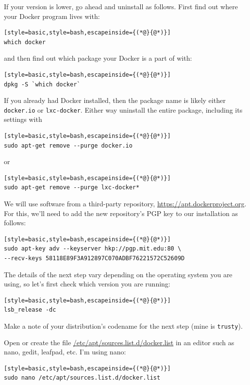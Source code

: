 \documentclass[12pt, a4paper, twoside, openany, titlepage]{book}
\begin{document}
If your version is lower, go ahead and uninstall as follows. First find out where your Docker program lives with:
\begin{lstlisting}[style=basic,style=bash,escapeinside={(*@}{@*)}]
which docker
\end{lstlisting}

and then find out which package your Docker is a part of with:
\begin{lstlisting}[style=basic,style=bash,escapeinside={(*@}{@*)}]
dpkg -S `which docker`
\end{lstlisting}

If you already had Docker installed, then the package name is likely either \texttt{docker.io} or \texttt{lxc-docker}. Either way uninstall the entire package, including its settings with
\begin{lstlisting}[style=basic,style=bash,escapeinside={(*@}{@*)}]
sudo apt-get remove --purge docker.io
\end{lstlisting}
or
\begin{lstlisting}[style=basic,style=bash,escapeinside={(*@}{@*)}]
sudo apt-get remove --purge lxc-docker*
\end{lstlisting}

We will use software from a third-party repository, \url{https://apt.dockerproject.org}. For this, we'll need to add the new repository's PGP key to our installation as follows:
\begin{lstlisting}[style=basic,style=bash,escapeinside={(*@}{@*)}]
sudo apt-key adv --keyserver hkp://pgp.mit.edu:80 \
--recv-keys 58118E89F3A912897C070ADBF76221572C52609D
\end{lstlisting}

The details of the next step vary depending on the operating system you are using, so let's first check which version you are running:
\begin{lstlisting}[style=basic,style=bash,escapeinside={(*@}{@*)}]
lsb_release -dc
\end{lstlisting}
Make a note of your distribution's codename for the next step (mine is \texttt{trusty}).

Open or create the file \url{/etc/apt/sources.list.d/docker.list} in an editor such as nano, gedit, leafpad, etc. I'm using nano:
\begin{lstlisting}[style=basic,style=bash,escapeinside={(*@}{@*)}]
sudo nano /etc/apt/sources.list.d/docker.list
\end{lstlisting}
\end{document}
